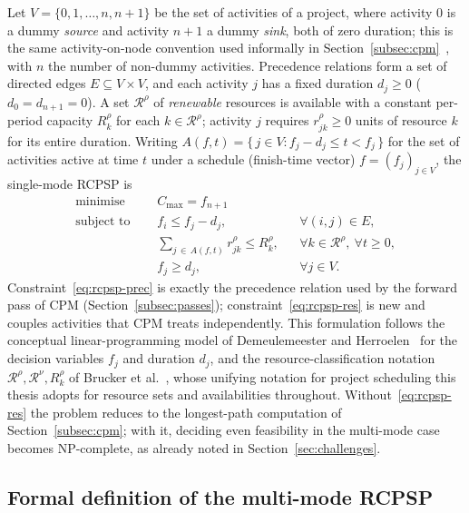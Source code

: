 Let $V = \{0, 1, \dots, n, n+1\}$ be the set of activities of a project, where
activity $0$ is a dummy \emph{source} and activity $n+1$ a dummy \emph{sink},
both of zero duration; this is the same activity-on-node convention used
informally in Section~\ref{subsec:cpm}~\cite{demeulemeester2002}, with $n$ the
number of non-dummy activities. Precedence relations form a set of directed
edges $E \subseteq V \times V$, and each activity $j$ has a fixed duration
$d_j \ge 0$ ($d_0 = d_{n+1} = 0$). A set $\mathcal{R}^{\rho}$ of \emph{renewable}
resources is available with a constant per-period capacity $R^{\rho}_k$ for
each $k \in \mathcal{R}^{\rho}$; activity $j$ requires $r^{\rho}_{jk} \ge 0$ units of
resource $k$ for its entire duration. Writing
$A(f,t) = \{\, j \in V : f_j - d_j \le t < f_j \,\}$ for the set of activities
active at time $t$ under a schedule (finish-time vector) $f = (f_j)_{j \in V}$,
the single-mode RCPSP is
\begin{align}
  \text{minimise } \quad & C_{\max} = f_{n+1} \label{eq:rcpsp-obj}\\
  \text{subject to } \quad
  & f_i \le f_j - d_j, && \forall (i,j) \in E, \label{eq:rcpsp-prec}\\
  & \sum_{j \,\in\, A(f,t)} r^{\rho}_{jk} \le R^{\rho}_k, && \forall k \in \mathcal{R}^{\rho},\ \forall t \ge 0, \label{eq:rcpsp-res}\\
  & f_j \ge d_j, && \forall j \in V. \label{eq:rcpsp-nonneg}
\end{align}
Constraint~\eqref{eq:rcpsp-prec} is exactly the precedence relation used by the
forward pass of CPM (Section~\ref{subsec:passes}); constraint~\eqref{eq:rcpsp-res}
is new and couples activities that CPM treats independently. This formulation
follows the conceptual linear-programming model of Demeulemeester and
Herroelen~\cite{demeulemeester2002} for the decision variables $f_j$ and
duration $d_j$, and the resource-classification notation
$\mathcal{R}^\rho,\mathcal{R}^\nu,R^\rho_k$ of Brucker et
al.~\cite{brucker1999}, whose unifying notation for project scheduling this
thesis adopts for resource sets and availabilities throughout.
Without~\eqref{eq:rcpsp-res} the problem reduces to the
longest-path computation of Section~\ref{subsec:cpm}; with it, deciding even
feasibility in the multi-mode case becomes NP-complete, as already noted in
Section~\ref{sec:challenges}.

\subsection{Formal definition of the multi-mode RCPSP}
\label{subsec:mrcpsp-model}

